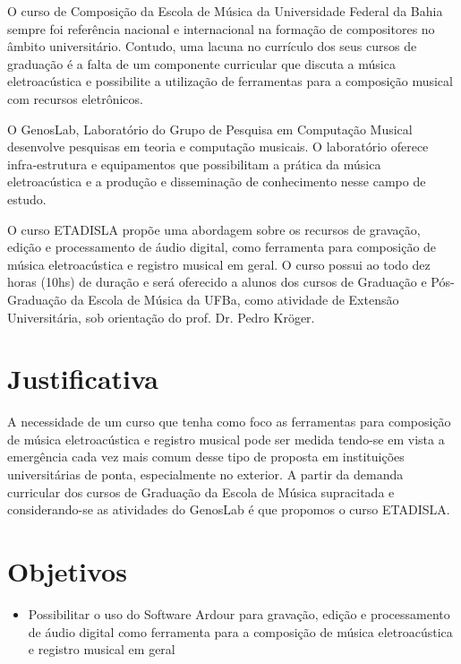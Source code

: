 \documentclass{article}
\begin{document}
O curso de Composição da Escola de Música da Universidade Federal da
Bahia sempre foi referência nacional e internacional na formação de
compositores no âmbito universitário. Contudo, uma lacuna no currículo
dos seus cursos de graduação é a falta de um componente curricular que
discuta a música eletroacústica e possibilite a utilização de
ferramentas para a composição musical com recursos eletrônicos.

O GenosLab, Laboratório do Grupo de Pesquisa em Computação Musical
desenvolve pesquisas em teoria e computação musicais. O laboratório
oferece infra-estrutura e equipamentos que possibilitam a prática da
música eletroacústica e a produção e disseminação de conhecimento
nesse campo de estudo.

O curso ETADISLA propõe uma abordagem sobre os recursos de gravação,
edição e processamento de áudio digital, como ferramenta para
composição de música eletroacústica e registro musical em geral.  O
curso possui ao todo dez horas (10hs) de duração e será oferecido a
alunos dos cursos de Graduação e Pós-Graduação da Escola de Música da
UFBa, como atividade de Extensão Universitária, sob orientação do
prof. Dr. Pedro Kröger.


\section{Justificativa}

A necessidade de um curso que tenha como foco as ferramentas para
composição de música eletroacústica e registro musical pode ser medida
tendo-se em vista a emergência cada vez mais comum desse tipo de
proposta em instituições universitárias de ponta, especialmente no
exterior. A partir da demanda curricular dos cursos de Graduação da
Escola de Música supracitada e considerando-se as atividades do
GenosLab é que propomos o curso ETADISLA.


		
\section{Objetivos}

\begin{itemize}
\item Possibilitar o uso do Software Ardour para gravação, edição e
processamento de áudio digital como ferramenta para a composição de
música eletroacústica e registro musical em geral
\end{itemize}
\end{document}
